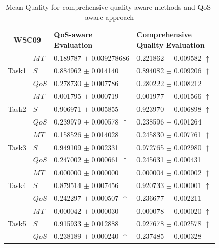 \documentclass{IEEEtran}
\begin{document}
\begin{table}[]
\footnotesize
\centering
\caption{Mean Quality for comprehensive quality-aware methods and QoS-aware approach}
\label{decisionTable}
\begin{tabular}{l|l|l|l}
\hline
\multicolumn{2}{c|}{WSC09}              & \shortstack{QoS-aware \\ Evaluation} & \shortstack{Comprehensive \\ Quality Evaluation} \\ \hline
\multirow{3}{*}{Task1}  &$MT$   &0.189787 $\pm$ 0.039278686            &0.221862 $\pm$ 0.009582 $\uparrow$ \\ \cline{2-4} 
                        &$S$    &0.884962 $\pm$ 0.014140               &0.894082 $\pm$ 0.009206 $\uparrow$ \\ \cline{2-4}
                        &$QoS$  &0.278730 $\pm$ 0.007786               &0.280222 $\pm$ 0.008212                          \\ \hline
\multirow{3}{*}{Task2}  &$MT$   &0.001795 $\pm$ 0.000719               &0.001977 $\pm$ 0.001566 $\uparrow$ \\ \cline{2-4} 
                        &$S$    &0.906971 $\pm$ 0.005855               &0.923970 $\pm$ 0.006898 $\uparrow$   \\ \cline{2-4}
                        &$QoS$  &0.239979 $\pm$ 0.000578 $\uparrow$    &0.238596 $\pm$ 0.001264 \\ \hline
\multirow{3}{*}{Task3}  &$MT$   &0.158526 $\pm$ 0.014028               &0.245830 $\pm$ 0.007761 $\uparrow$   \\ \cline{2-4} 
                        &$S$    &0.949109 $\pm$ 0.002331               &0.972765 $\pm$ 0.002980 $\uparrow$           \\ \cline{2-4}
                        &$QoS$  &0.247002 $\pm$ 0.000661 $\uparrow$    &0.245631 $\pm$ 0.000431            \\ \hline
\multirow{3}{*}{Task4}  &$MT$   &0.000000 $\pm$ 0.000000               &0.000004 $\pm$ 0.000002 $\uparrow$ \\ \cline{2-4} 
                        &$S$    &0.879514 $\pm$ 0.007456               &0.920733 $\pm$ 0.000001 $\uparrow$ \\ \cline{2-4}
                        &$QoS$  &0.242297 $\pm$ 0.000507 $\uparrow$    &0.236677 $\pm$ 0.002211  \\ \hline
\multirow{3}{*}{Task5}  &$MT$   &  0.000042 $\pm$ 0.000030             &0.000078 $\pm$ 0.000020 $\uparrow$           \\ \cline{2-4} 
                        &$S$    &  0.915933 $\pm$ 0.012888             &0.927678 $\pm$ 0.002578 $\uparrow$                 \\ \cline{2-4}
                        &$QoS$  & 0.238189 $\pm$ 0.000240 $\uparrow$      &  0.237485 $\pm$  0.000328  \\ \hline                                                   
\end{tabular}
\end{table}
\end{document}
